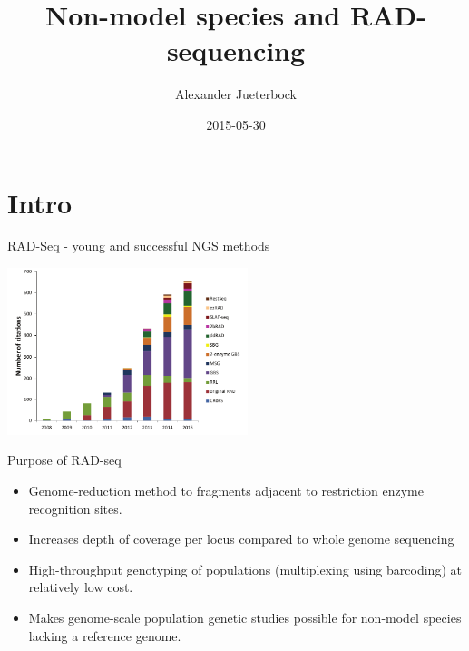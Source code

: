 \documentclass[presentation]{beamer}
\author{Alexander Jueterbock}
\date{2015-05-30}
\title{Non-model species and RAD-sequencing}
\begin{document}
\maketitle



\section{Intro}
\label{sec-1}
\begin{frame}[label=sec-1-0-1]{RAD-Seq - young and successful NGS methods}
\begin{center}


\includegraphics[width=7cm]{Andrews2016Sup1.png}

\tiny{\citep{Andrews2016}}
\end{center}
\end{frame}


\begin{frame}[label=sec-1-0-2]{Purpose of RAD-seq}
\begin{itemize}
\item Genome-reduction method to fragments adjacent to restriction enzyme
recognition sites.
\item Increases depth of coverage per locus compared to whole genome
sequencing
\item High-throughput genotyping of populations (multiplexing using
barcoding) at relatively low cost.
\item Makes genome-scale population genetic studies possible for non-model
species lacking a reference genome.
\end{itemize}
\end{frame}
\end{document}

